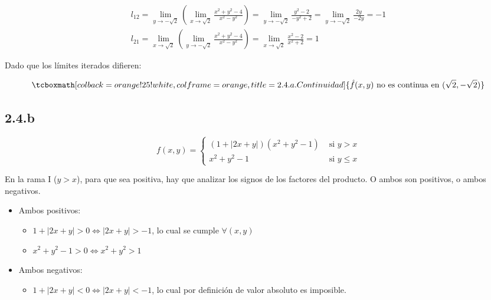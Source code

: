 \documentclass{article}
\begin{document}
\begin{subequations}
\begin{align}
l_{12} = \lim_{y \rightarrow -\sqrt{2}} \left( \lim_{x \rightarrow \sqrt{2}} \frac{x^2 + y^2 - 4}{x^2 - y^2} \right) = \lim_{y \rightarrow -\sqrt{2}} \frac{y^2 - 2}{-y^2 + 2} = \lim_{y \rightarrow -\sqrt{2}} \frac{2y}{-2y} = -1 \\
l_{21} = \lim_{x \rightarrow \sqrt{2}} \left( \lim_{y \rightarrow -\sqrt{2}} \frac{x^2 + y^2 - 4}{x^2 - y^2} \right) = \lim_{x \rightarrow \sqrt{2}} \frac{x^2 - 2}{x^2 + 2} = 1
\end{align}
\end{subequations}

Dado que los límites iterados difieren:

\begin{equation}
\tcboxmath[colback=orange!25!white,colframe=orange,title=2.4.a. Continuidad]
{ \hat{f}(x,y) \text{ no es continua en } (\sqrt{2}, -\sqrt{2}) }
\end{equation}

\subsection*{2.4.b}
\label{subsec:2.4.b}

\begin{equation}
f(x,y) = \left\{ \begin{array}{ll}
(1 + |2x + y|) (x^2 + y^2 - 1) &\text{ si } y > x \\
x^2 + y^2 - 1 &\text{ si } y \leq x
\end{array} \right.
\end{equation}

En la rama I ($y > x$), para que sea positiva, hay que analizar los signos de los factores del producto. O ambos son positivos, o ambos negativos.

\begin{itemize}
\item Ambos positivos:
	\begin{itemize}
		\item $1 + |2x + y| > 0 \Leftrightarrow |2x + y| > -1$, lo cual se cumple $\forall (x,y)$
		\item $x^2 + y^2 -1 > 0 \Leftrightarrow x^2 + y^2 > 1$
	\end{itemize}
\item Ambos negativos:
	\begin{itemize}
		\item $1 + |2x + y| < 0 \Leftrightarrow |2x + y| < -1$, lo cual por definición de valor absoluto es imposible.
	\end{itemize}
\end{itemize}
\end{document}
